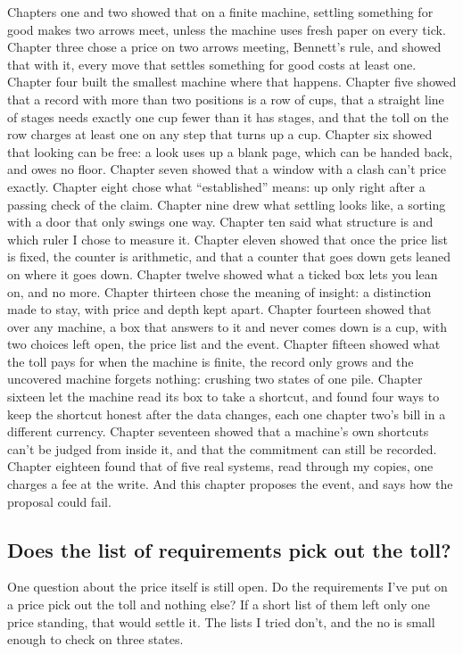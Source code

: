 \documentclass[11pt,twoside]{article}
\theoremstyle{thielethm}
\theoremstyle{thieledef}
\theoremstyle{thieledef}
\theoremstyle{thieledef}
\theoremstyle{thielethm}
\theoremstyle{thieleobs}
\theoremstyle{thielethm}
\begin{document}
Chapters one and two showed that on a finite machine, settling something for good makes two arrows meet, unless the machine uses fresh paper on every tick. Chapter three chose a price on two arrows meeting, Bennett's rule, and showed that with it, every move that settles something for good costs at least one. Chapter four built the smallest machine where that happens. Chapter five showed that a record with more than two positions is a row of cups, that a straight line of stages needs exactly one cup fewer than it has stages, and that the toll on the row charges at least one on any step that turns up a cup. Chapter six showed that looking can be free: a look uses up a blank page, which can be handed back, and owes no floor. Chapter seven showed that a window with a clash can't price exactly. Chapter eight chose what ``established'' means: up only right after a passing check of the claim. Chapter nine drew what settling looks like, a sorting with a door that only swings one way. Chapter ten said what structure is and which ruler I chose to measure it. Chapter eleven showed that once the price list is fixed, the counter is arithmetic, and that a counter that goes down gets leaned on where it goes down. Chapter twelve showed what a ticked box lets you lean on, and no more. Chapter thirteen chose the meaning of insight: a distinction made to stay, with price and depth kept apart. Chapter fourteen showed that over any machine, a box that answers to it and never comes down is a cup, with two choices left open, the price list and the event. Chapter fifteen showed what the toll pays for when the machine is finite, the record only grows and the uncovered machine forgets nothing: crushing two states of one pile. Chapter sixteen let the machine read its box to take a shortcut, and found four ways to keep the shortcut honest after the data changes, each one chapter two's bill in a different currency. Chapter seventeen showed that a machine's own shortcuts can't be judged from inside it, and that the commitment can still be recorded. Chapter eighteen found that of five real systems, read through my copies, one charges a fee at the write. And this chapter proposes the event, and says how the proposal could fail.

\subsection{Does the list of requirements pick out the toll?}

One question about the price itself is still open. Do the requirements I've put on a price pick out the toll and nothing else? If a short list of them left only one price standing, that would settle it. The lists I tried don't, and the no is small enough to check on three states.
\end{document}
